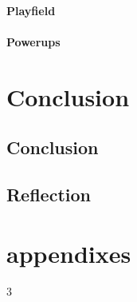 \begin{multicols}{3}
\subsection{Playfield}
\subsection{Powerups}


\part{Conclusion}

\chapter{Conclusion}
\chapter{Reflection}



\part{appendixes}

% 
% 

\end{multicols}{3}

